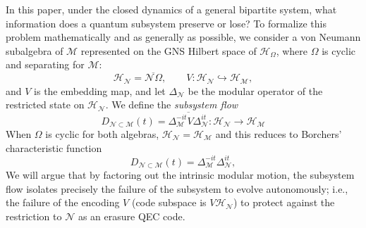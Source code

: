\documentclass[a4paper,11pt]{article}
\theoremstyle{definition}
\newcommand{\mN}{\mathcal{N}}
\newcommand{\mH}{\mathcal{H}}
\newcommand{\mM}{\mathcal{M}}
\begin{document}
In this paper, under the closed dynamics of a general bipartite system, what information does a quantum subsystem preserve or lose? 
To formalize this problem mathematically and as generally as possible, we consider a von Neumann subalgebra of $\mM$ represented on the GNS Hilbert space of $\mH_\Omega$, where $\Omega$ is cyclic and separating for $\mM$:
\begin{equation}
    \mH_{\mN}=\overline{\mN\Omega},
    \qquad
    V:\mH_{\mN}\hookrightarrow\mH_{\mM} ,
\end{equation}
and $V$ is the embedding map, and let $\Delta_{\mN}$ be the modular operator of the restricted state on $\mH_{\mN}$.  We define the {\it subsystem flow}
\begin{equation}
    D_{\mN\subset\mM}(t)
    =
    \overline{\Delta_{\mM}^{-it}V\Delta_{\mN}^{it}}:\mH_{\mN}\to \mH_{\mM}
    \label{eq:intro-compressed-flow}
\end{equation}
When $\Omega$ is cyclic for both algebras, $\mH_{\mN}=\mH_{\mM}$ and this reduces to Borchers' characteristic function \cite{revolutionizing}
\begin{equation}
    D_{\mN\subset\mM}(t)
    =
    \Delta_{\mM}^{-it}\Delta_{\mN}^{it},
    \label{eq:intro-subsystem-flow}
\end{equation}
We will argue that by factoring out the intrinsic modular motion, the subsystem flow isolates precisely the failure of the subsystem to evolve autonomously; i.e., the failure of the encoding $V$ (code subspace is $V\mH_{\mN}$) to protect against the restriction to $\mN$ as an erasure QEC code.
\end{document}
